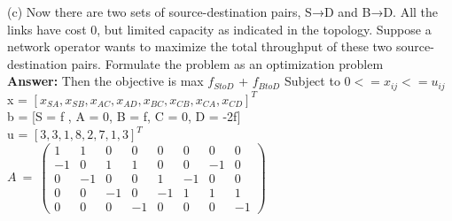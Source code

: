 \documentclass[12pt]{article}
\begin{document}
\begin{enumerate}
(c) Now there are two sets of source-destination pairs, S→D and B→D. All the links have cost 0, but limited capacity as indicated in the topology. Suppose a network operator wants to maximize the total throughput of these two source-destination pairs. Formulate the problem as an optimization problem\\
\textbf{Answer:} Then the objective is max $f_{S to D}$ + $f_{B to D}$ Subject to $0 <= x_{ij} <= u_{ij}$\\
x = $[x_{SA}, x_{SB}, x_{AC}, x_{AD}, x_{BC}, x_{CB}, x_{CA}, x_{CD}]^T$\\
b = [S = f , A = 0, B = f, C = 0, D = -2f]\\
u = $[3, 3, 1, 8, 2, 7, 1, 3]^T$\\
$A\:=\:\begin{pmatrix}1&1&0&0&0&0&0&0\\ -1&0&1&1&0&0&-1&0\\ 0&-1&0&0&1&-1&0&0\\ 0&0&-1&0&-1&1&1&1\\ 0&0&0&-1&0&0&0&-1\end{pmatrix}$\\

\end{enumerate}
\end{document}
